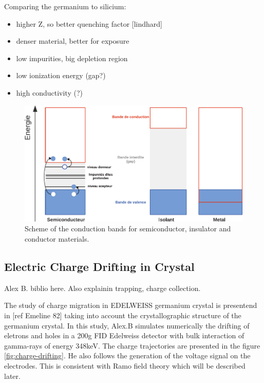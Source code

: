 Comparing the germanium to silicium:
\begin{itemize}
	\item higher Z, so better quenching factor [lindhard]
	\item denser material, better for exposure
	\item low impurities, big depletion region
	\item low ionization energy (gap?)
	\item high conductivity (?)
\end{itemize}

\begin{figure}
\centering
\includegraphics[width=\linewidth]{Figures/Electrodes/conduction_bands.pdf}
\caption{Scheme of the conduction bands for semiconductor, insulator and conductor materials.}
\label{fig:conduction-bands}
\end{figure}


\subsection{Electric Charge Drifting in Crystal}

{\color{red}
Alex B. biblio here.
Also explainin trapping, charge collection.
}

The study of charge migration in EDELWEISS germanium crystal is presentend in [ref Emeline 82] taking into account the crystallographic structure of the germanium crystal. In this study, Alex.B simulates numerically the drifting of eletrons and holes in a 200g FID Edelweiss detector with bulk interaction of gamma-rays of energy 348keV. The charge trajectories are presented in the figure \ref{fig:charge-drifting}. He also follows the generation of the voltage signal on the electrodes. This is consistent with Ramo field theory which will be described later.

